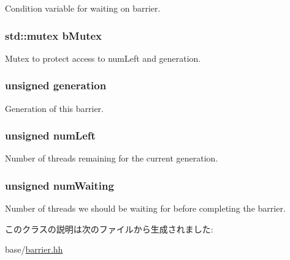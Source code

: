 Condition variable for waiting on barrier. \hypertarget{classBarrier_a40dd1fa204ad5ba9ae7880f21ba810e1}{
\subsubsection[{bMutex}]{\setlength{\rightskip}{0pt plus 5cm}std::mutex {\bf bMutex}}}
\label{classBarrier_a40dd1fa204ad5ba9ae7880f21ba810e1}


Mutex to protect access to numLeft and generation. \hypertarget{classBarrier_a9db7eb9a8410fd508ad6dc871cdc8a47}{
\subsubsection[{generation}]{\setlength{\rightskip}{0pt plus 5cm}unsigned {\bf generation}}}
\label{classBarrier_a9db7eb9a8410fd508ad6dc871cdc8a47}


Generation of this barrier. \hypertarget{classBarrier_a29f3fa2b3a19d46d1524bfaa351ceeab}{
\subsubsection[{numLeft}]{\setlength{\rightskip}{0pt plus 5cm}unsigned {\bf numLeft}}}
\label{classBarrier_a29f3fa2b3a19d46d1524bfaa351ceeab}


Number of threads remaining for the current generation. \hypertarget{classBarrier_a2fc1e8c1c5053f7cd70d3797d8ddbb1f}{
\subsubsection[{numWaiting}]{\setlength{\rightskip}{0pt plus 5cm}unsigned {\bf numWaiting}}}
\label{classBarrier_a2fc1e8c1c5053f7cd70d3797d8ddbb1f}


Number of threads we should be waiting for before completing the barrier. 

このクラスの説明は次のファイルから生成されました:\begin{DoxyCompactItemize}
\item 
base/\hyperlink{barrier_8hh}{barrier.hh}\end{DoxyCompactItemize}
